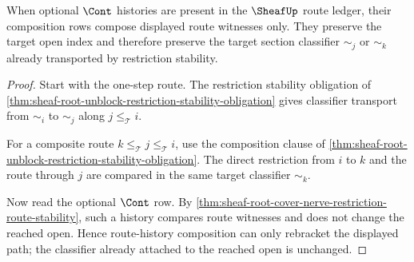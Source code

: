 \begin{theorem}
\label{thm:sheaf-root-route-exactness-cont-composition}
When optional $\Cont$ histories are present in the $\SheafUp$ route ledger, their composition rows compose displayed route witnesses only. They preserve the target open index and therefore preserve the target section classifier $\sim_j$ or $\sim_k$ already transported by restriction stability.
\end{theorem}
\begin{proof}
Start with the one-step route. The restriction stability obligation of \autoref{thm:sheaf-root-unblock-restriction-stability-obligation} gives classifier transport from $\sim_i$ to $\sim_j$ along $j\le_{\mathcal{T}}i$.

For a composite route $k\le_{\mathcal{T}}j\le_{\mathcal{T}}i$, use the composition clause of \autoref{thm:sheaf-root-unblock-restriction-stability-obligation}. The direct restriction from $i$ to $k$ and the route through $j$ are compared in the same target classifier $\sim_k$.

Now read the optional $\Cont$ row. By \autoref{thm:sheaf-root-cover-nerve-restriction-route-stability}, such a history compares route witnesses and does not change the reached open. Hence route-history composition can only rebracket the displayed path; the classifier already attached to the reached open is unchanged.
\end{proof}

